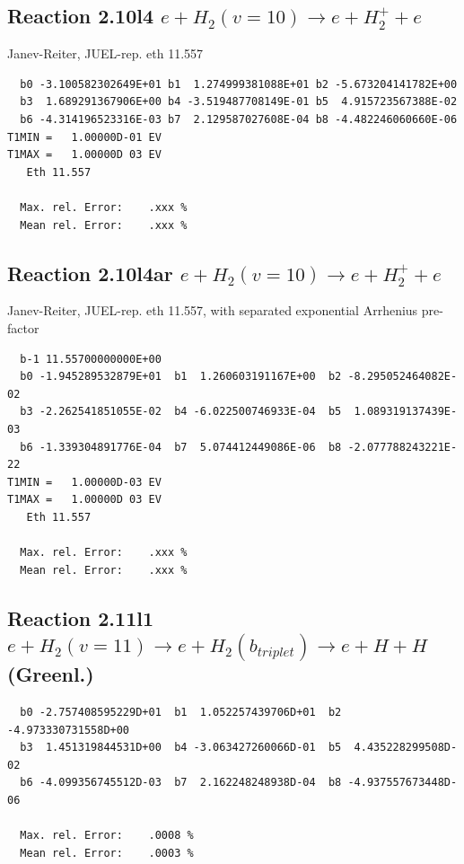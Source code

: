 \documentclass[12pt,dvipdfmx]{article}
\begin{document}
\subsection{
Reaction 2.10l4
 $ e + H_2(v=10) \rightarrow e + H_2^+  + e$
}
Janev-Reiter, JUEL-rep. eth 11.557

\begin{small}\begin{verbatim}
  b0 -3.100582302649E+01 b1  1.274999381088E+01 b2 -5.673204141782E+00
  b3  1.689291367906E+00 b4 -3.519487708149E-01 b5  4.915723567388E-02
  b6 -4.314196523316E-03 b7  2.129587027608E-04 b8 -4.482246060660E-06
T1MIN =   1.00000D-01 EV
T1MAX =   1.00000D 03 EV
   Eth 11.557

  Max. rel. Error:    .xxx %
  Mean rel. Error:    .xxx %
\end{verbatim}\end{small}

\subsection{
Reaction 2.10l4ar
 $ e + H_2(v=10) \rightarrow e + H_2^+  + e$
}
Janev-Reiter, JUEL-rep. eth 11.557,
with separated exponential Arrhenius pre-factor

\begin{small}\begin{verbatim}
  b-1 11.55700000000E+00
  b0 -1.945289532879E+01  b1  1.260603191167E+00  b2 -8.295052464082E-02
  b3 -2.262541851055E-02  b4 -6.022500746933E-04  b5  1.089319137439E-03
  b6 -1.339304891776E-04  b7  5.074412449086E-06  b8 -2.077788243221E-22
T1MIN =   1.00000D-03 EV
T1MAX =   1.00000D 03 EV
   Eth 11.557

  Max. rel. Error:    .xxx %
  Mean rel. Error:    .xxx %
\end{verbatim}\end{small}

\newpage
\subsection{
Reaction 2.11l1
$ e + H_2(v=11) \rightarrow e + H_2(b_{triplet})\rightarrow e + H + H $ (Greenl.)
}


\begin{small}\begin{verbatim}
  b0 -2.757408595229D+01  b1  1.052257439706D+01  b2 -4.973330731558D+00
  b3  1.451319844531D+00  b4 -3.063427260066D-01  b5  4.435228299508D-02
  b6 -4.099356745512D-03  b7  2.162248248938D-04  b8 -4.937557673448D-06

  Max. rel. Error:    .0008 %
  Mean rel. Error:    .0003 %
\end{verbatim}\end{small}
\end{document}
